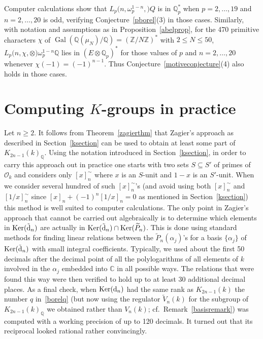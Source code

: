 \documentclass{amsart}
\begin{document}
\begin{remark}\label{dirichletcalculations}
Computer calculations show that $ {L_{p}(n,{\omega_p^{1-n}},{\mathbb)}Q} $ is in $ {\mathbb Q}_p^* $
when $ p=2,\dots,19 $ and $ n=2,\dots,20 $ is odd, verifying Conjecture~\ref{pborel}(3) in those cases.
Similarly, with notation and assumptions as in Proposition~\ref{abelprop},
for the 470 primitive characters $ \chi $ of $ {\operatorname{Gal}}({\mathbb Q}({\mu}_N)/{\mathbb Q}) = ({\mathbb Z}/N{\mathbb Z})^* $ with $ 2\le N \le 50 $, 
$ {L_{p}(n,{\chi,{\otimes})}\omega_p^{1-n}} {\mathbb Q} $ lies in $ (E{\otimes} {{\mathbb Q_p}})^* $
for those values of $ p $ and $ n=2,\dots,20 $ whenever  $ \chi(-1) = (-1)^{n-1} $.
Thus Conjecture~\ref{motiveconjecture}(4) also holds in those cases.
\end{remark}

\section{Computing $ K $-groups in practice}
\label{practical}

Let $ n \ge 2 $.
It follows from Theorem~\ref{zagierthm} that Zagier's approach as described in Section~\ref{ksection} can be used to obtain at least
some part of $ {K_{2n-1}(k)_{\mathbb Q}}$.
 Using the notation introduced in Section~\ref{ksection}, in order to carry this approach out in practice
one starts with two sets $ S \subseteq S' $ of primes of $ {{\mathcal O}_k} $ and considers only 
$ [x]_n^\sim $ where $ x $ is an $ S $-unit and $ 1-x $ is an $ S' $-unit.
When we consider several
hundred of such $ [x]_n^\sim $'s (and avoid using both $ [x]_n^\sim $ and $ [1/x]_n^\sim $ since
$ [x]_n + (-1)^n [1/x]_n = 0 $ as mentioned in Section~\ref{ksection}) this method is
well suited to computer calculations.
The only point in Zagier's approach that cannot be carried out algebraically
is to determine which elements in $ {\operatorname{Ker}}(\tilde{{\textup{d}}}_n) $ are actually
in $ {\operatorname{Ker}}(\tilde{{\textup{d}}}_n) \cap {\operatorname{Ker}}(\widetilde P_n) $.  This is done using standard
methods for finding linear relations between the $ \widetilde P_n({\alpha}_j) $'s for a basis $ \{{\alpha}_j\} $ of $ {\operatorname{Ker}}(\tilde{{\textup{d}}}_n) $
with small integral coefficients.  
Typically, we used
about the first 50 decimals after the decimal point of all the polylogarithms
of all elements of $ k $ involved in the $ {\alpha}_j $ embedded into $ {\mathbb C} $ in all possible ways.
The relations that were found this way were then verified to hold up to at least 30 additional
decimal places.
As a final check, when $ {\operatorname{Ker}}({{\textup{d}}}_n) $ had the same rank as $ K_{2n-1}(k) $ the number $ q $
in~\eqref{borelq} (but now using the regulator $ \widetilde V_n(k) $ for the subgroup of $ {K_{2n-1}(k)_{\mathbb Q}}$ we obtained rather
than $ V_n(k) $; cf.~Remark~\ref{basisremark}) was computed with a working precision of up to 120
decimals.
It turned out that its reciprocal looked rational rather convincingly.
\end{document}
